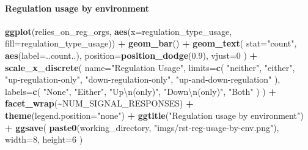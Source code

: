 \documentclass[
]{book}
\newenvironment{Shaded}{\begin{snugshade}}{\end{snugshade}}
\newcommand{\CharTok}[1]{\textcolor[rgb]{0.31,0.60,0.02}{#1}}
\newcommand{\DataTypeTok}[1]{\textcolor[rgb]{0.13,0.29,0.53}{#1}}
\newcommand{\DecValTok}[1]{\textcolor[rgb]{0.00,0.00,0.81}{#1}}
\newcommand{\FloatTok}[1]{\textcolor[rgb]{0.00,0.00,0.81}{#1}}
\newcommand{\KeywordTok}[1]{\textcolor[rgb]{0.13,0.29,0.53}{\textbf{#1}}}
\newcommand{\NormalTok}[1]{#1}
\newcommand{\OperatorTok}[1]{\textcolor[rgb]{0.81,0.36,0.00}{\textbf{#1}}}
\newcommand{\StringTok}[1]{\textcolor[rgb]{0.31,0.60,0.02}{#1}}
\begin{document}
\hypertarget{regulation-usage-by-environment}{%
\paragraph{Regulation usage by environment}\label{regulation-usage-by-environment}}

\begin{Shaded}
\begin{Highlighting}[]
\KeywordTok{ggplot}\NormalTok{(relies\_on\_reg\_orgs, }\KeywordTok{aes}\NormalTok{(}\DataTypeTok{x=}\NormalTok{regulation\_type\_usage, }\DataTypeTok{fill=}\NormalTok{regulation\_type\_usage)) }\OperatorTok{+}
\StringTok{  }\KeywordTok{geom\_bar}\NormalTok{() }\OperatorTok{+}
\StringTok{  }\KeywordTok{geom\_text}\NormalTok{(}
    \DataTypeTok{stat=}\StringTok{"count"}\NormalTok{,}
    \KeywordTok{aes}\NormalTok{(}\DataTypeTok{label=}\NormalTok{..count..),}
    \DataTypeTok{position=}\KeywordTok{position\_dodge}\NormalTok{(}\FloatTok{0.9}\NormalTok{),}
    \DataTypeTok{vjust=}\DecValTok{0}
\NormalTok{  ) }\OperatorTok{+}
\StringTok{  }\KeywordTok{scale\_x\_discrete}\NormalTok{(}
    \DataTypeTok{name=}\StringTok{"Regulation Usage"}\NormalTok{,}
    \DataTypeTok{limits=}\KeywordTok{c}\NormalTok{(}
      \StringTok{"neither"}\NormalTok{,}
      \StringTok{"either"}\NormalTok{,}
      \StringTok{"up{-}regulation{-}only"}\NormalTok{,}
      \StringTok{"down{-}regulation{-}only"}\NormalTok{,}
      \StringTok{"up{-}and{-}down{-}regulation"}
\NormalTok{    ),}
    \DataTypeTok{labels=}\KeywordTok{c}\NormalTok{(}
      \StringTok{"None"}\NormalTok{,}
      \StringTok{"Either"}\NormalTok{,}
      \StringTok{"Up}\CharTok{\textbackslash{}n}\StringTok{(only)"}\NormalTok{,}
      \StringTok{"Down}\CharTok{\textbackslash{}n}\StringTok{(only)"}\NormalTok{,}
      \StringTok{"Both"}
\NormalTok{    )}
\NormalTok{  ) }\OperatorTok{+}
\StringTok{  }\KeywordTok{facet\_wrap}\NormalTok{(}\OperatorTok{\textasciitilde{}}\NormalTok{NUM\_SIGNAL\_RESPONSES) }\OperatorTok{+}
\StringTok{  }\KeywordTok{theme}\NormalTok{(}\DataTypeTok{legend.position=}\StringTok{"none"}\NormalTok{) }\OperatorTok{+}
\StringTok{  }\KeywordTok{ggtitle}\NormalTok{(}\StringTok{"Regulation usage by environment"}\NormalTok{) }\OperatorTok{+}
\StringTok{  }\KeywordTok{ggsave}\NormalTok{(}
    \KeywordTok{paste0}\NormalTok{(working\_directory, }\StringTok{"imgs/rst{-}reg{-}usage{-}by{-}env.png"}\NormalTok{),}
    \DataTypeTok{width=}\DecValTok{8}\NormalTok{,}
    \DataTypeTok{height=}\DecValTok{6}
\NormalTok{  )}
\end{Highlighting}
\end{Shaded}
\end{document}
